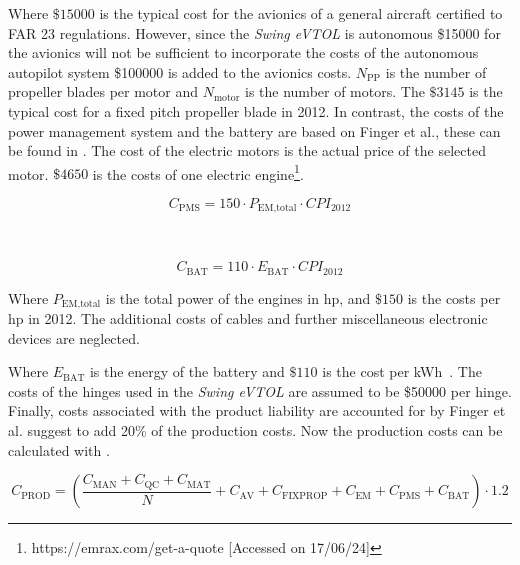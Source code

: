 Where $\$15000$ is the typical cost for the avionics of a general aircraft certified to FAR 23 regulations.
However, since the \textit{Swing eVTOL} is autonomous \$15000 for the avionics will not be sufficient to incorporate the costs of the autonomous autopilot system \$100000 is added to the avionics costs. $N_{\text{PP}}$ is the number of propeller blades per motor and $N_{\text{motor}}$ is the number of motors.
The $\$3145$ is the typical cost for a fixed pitch propeller blade in 2012.
In contrast, the costs of the power management system and the battery are based on Finger et al., these can be found in .
The cost of the electric motors is the actual price of the selected motor. $\$4650$ is the costs of one electric engine\footnote{https://emrax.com/get-a-quote [Accessed on 17/06/24]}.

\begin{minipage}{0.45\textwidth}
\begin{equation}
    \label{eq:cost:PMScost}
    C_{\text{PMS}} = 150 \cdot P_{\text{EM,total}} \cdot CPI_{2012}
\end{equation}
\end{minipage}
~
\begin{minipage}{0.45\textwidth}
    \begin{equation}
    \label{eq:cost:BATcost}
    C_{\text{BAT}} = 110 \cdot E_{\text{BAT}} \cdot CPI_{2012}
\end{equation}
\end{minipage}

Where $P_{\text{EM,total}}$ is the total power of the engines in hp, and $\$150$ is the costs per hp in 2012.
The additional costs of cables and further miscellaneous electronic devices are neglected\cite{Hoelzen2018}.



Where $E_{\text{BAT}}$ is the energy of the battery and $\$110$ is the cost per kWh~\cite{Batery_Density}.
The costs of the hinges used in the \textit{Swing eVTOL} are assumed to be \$50000 per hinge.
Finally, costs associated with the product liability are accounted for by Finger et al.
suggest to add 20\% of the production costs.
Now the production costs can be calculated with .

\begin{equation}
    \label{eq:cost:prod_costs}
    C_{\text{PROD}} = \left(\frac{C_{\text{MAN}} + C_{\text{QC}} + C_{\text{MAT}}}{N} + C_{\text{AV}} + C_{\text{FIXPROP}} + C_{\text{EM}} + C_{\text{PMS}} + C_{\text{BAT}}\right) \cdot 1.2
\end{equation}

